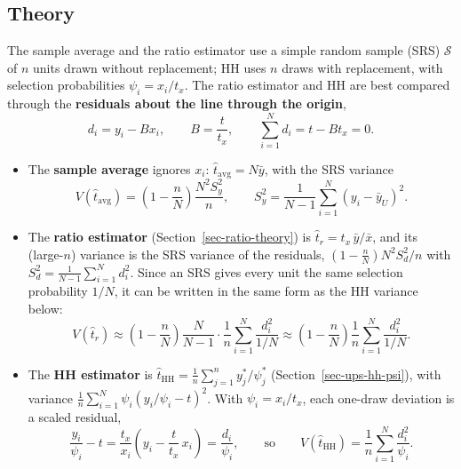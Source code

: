 \documentclass[
  letterpaper,
  DIV=11,
  numbers=noendperiod]{scrreprt}
\providecommand{\tightlist}{%
  \setlength{\itemsep}{0pt}\setlength{\parskip}{0pt}}
\renewcommand{\[}{\begin{equation}}
\renewcommand{\]}{\end{equation}}
\begin{document}
\subsection{Theory}\label{sec-ups-compare-theory}

The sample average and the ratio estimator use a simple random sample
(SRS) \(\mathcal{S}\) of \(n\) units drawn without replacement; HH uses
\(n\) draws with replacement, with selection probabilities
\(\psi_i=x_i/t_x\). The ratio estimator and HH are best compared through
the \textbf{residuals about the line through the origin}, \[
d_i=y_i-Bx_i,\qquad B=\frac{t}{t_x},\qquad \sum_{i=1}^N d_i=t-Bt_x=0 .
\]

\begin{itemize}
\tightlist
\item
  The \textbf{sample average} ignores \(x_i\):
  \(\hat{t}_{\mathrm{avg}}=N\bar{y}\), with the SRS variance \[
  V(\hat{t}_{\mathrm{avg}})=\left(1-\frac nN\right)\frac{N^2S_y^2}{n},\qquad
  S_y^2=\frac{1}{N-1}\sum_{i=1}^N\left(y_i-\bar{y}_U\right)^2 .
  \]
\item
  The \textbf{ratio estimator} (Section~\ref{sec-ratio-theory}) is
  \(\hat{t}_r=t_x\,\bar{y}/\bar{x}\), and its (large-\(n\)) variance is
  the SRS variance of the residuals,
  \(\left(1-\frac nN\right)N^2S_d^2/n\) with
  \(S_d^2=\frac{1}{N-1}\sum_{i=1}^N d_i^2\). Since an SRS gives every
  unit the same selection probability \(1/N\), it can be written in the
  same form as the HH variance below: \[
  V(\hat{t}_r)\approx\left(1-\frac nN\right)\frac{N}{N-1}\cdot\frac1n\sum_{i=1}^N\frac{d_i^2}{1/N}
  \approx\left(1-\frac nN\right)\frac1n\sum_{i=1}^N\frac{d_i^2}{1/N}.
  \]
\item
  The \textbf{HH estimator} is
  \(\hat{t}_{\mathrm{HH}}=\frac1n\sum_{j=1}^n y_j^*/\psi_j^*\)
  (Section~\ref{sec-ups-hh-psi}), with variance
  \(\frac1n\sum_{i=1}^N\psi_i\left(y_i/\psi_i-t\right)^2\). With
  \(\psi_i=x_i/t_x\), each one-draw deviation is a scaled residual, \[
  \frac{y_i}{\psi_i}-t=\frac{t_x}{x_i}\left(y_i-\frac{t}{t_x}\,x_i\right)=\frac{d_i}{\psi_i},
  \qquad\text{so}\qquad
  V(\hat{t}_{\mathrm{HH}})=\frac1n\sum_{i=1}^N\frac{d_i^2}{\psi_i}.
  \]
\end{itemize}
\end{document}
